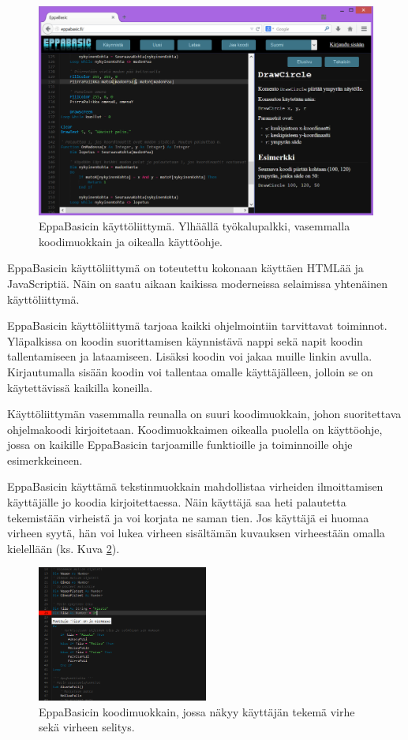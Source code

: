 \begin{figure}[h]
    \centering
    \includegraphics[width=1\textwidth]{kayttoliittyma}
    \caption{EppaBasicin käyttöliittymä. Ylhäällä työkalupalkki, vasemmalla koodimuokkain ja oikealla käyttöohje.}
    \label{img:kayttoliittyma}
\end{figure}

EppaBasicin käyttöliittymä on toteutettu
kokonaan käyttäen HTMLää ja JavaScriptiä.
Näin on saatu aikaan kaikissa moderneissa
selaimissa yhtenäinen käyttöliittymä.

EppaBasicin käyttöliittymä tarjoaa kaikki
ohjelmointiin tarvittavat toiminnot.
Yläpalkissa on koodin suorittamisen käynnistävä
nappi sekä napit koodin tallentamiseen ja lataamiseen.
Lisäksi koodin voi jakaa muille linkin avulla.
Kirjautumalla sisään koodin voi tallentaa
omalle käyttäjälleen, jolloin se on käytettävissä
kaikilla koneilla.

Käyttöliittymän vasemmalla reunalla on
suuri koodimuokkain, johon suoritettava
ohjelmakoodi kirjoitetaan.
Koodimuokkaimen oikealla puolella on
käyttöohje, jossa on kaikille
EppaBasicin tarjoamille funktioille
ja toiminnoille ohje esimerkkeineen.

EppaBasicin käyttämä tekstinmuokkain mahdollistaa
virheiden ilmoittamisen käyttäjälle jo
koodia kirjoitettaessa.
Näin käyttäjä saa heti palautetta tekemistään
virheistä ja voi korjata ne saman tien.
Jos käyttäjä ei huomaa virheen syytä,
hän voi lukea virheen sisältämän
kuvauksen virheestään omalla kielellään
(ks. Kuva \ref{img:virhe}).

\begin{figure}[h]
    \centering
    \includegraphics[width=0.5\textwidth]{virhe}
    \caption{EppaBasicin koodimuokkain, jossa näkyy käyttäjän tekemä virhe sekä virheen selitys.}
    \label{img:virhe}
\end{figure}

